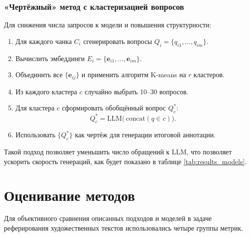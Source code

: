\documentclass{article}
\theoremstyle{definition}
\theoremstyle{plain}
\begin{document}
\subsubsection*{«Чертёжный» метод с кластеризацией вопросов}
Для снижения числа запросов к модели и повышения структурности:
\begin{enumerate}
  \item Для каждого чанка $C_i$ сгенерировать вопросы $Q_i = \{q_{i1},\dots,q_{im}\}$.
  \item Вычислить эмбеддинги $E_i = \{\mathbf{e}_{i1},\dots,\mathbf{e}_{im}\}$.
  \item Объединить все $\{\mathbf{e}_{ij}\}$ и применить алгоритм K‑means на $r$ кластеров.
  \item Из каждого кластера $c$ случайно выбрать 10–30 вопросов.
  \item Для кластера $c$ сформировать обобщённый вопрос $Q_c^*$:
    \[
      Q_c^* = \mathrm{LLM}\bigl(\,\text{concat}(q\in c)\bigr).
    \]
  \item Использовать $\{Q_c^*\}$ как чертёж для генерации итоговой аннотации.
\end{enumerate}

Такой подход позволяет уменьшить число обращений к LLM, что позволяет ускорить скорость генераций, как будет показано в таблице \ref{tab:results_models}.

\section*{Оценивание методов}

Для объективного сравнения описанных подходов и моделей в задаче реферирования художественных текстов использовались четыре группы метрик.
\end{document}
